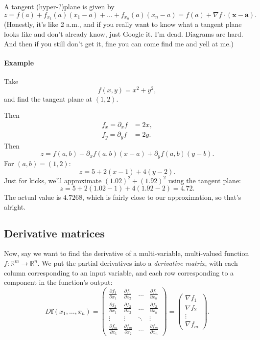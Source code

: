 \documentclass[11pt]{article}
\renewcommand{\vec}[1]{\mathbf{#1}}
\begin{document}
A tangent (hyper-?)plane is given by
\[
    z = f(a) + f_{x_1} (a) (x_1 - a) + \dots + f_{x_n} (a) (x_n - a) = f(a) + \nabla f \cdot (\vec x - \vec a).
\]
(Honestly, it's like 2 a.m., and if you really want to know what a tangent plane looks like and don't already know, just Google it. I'm dead. Diagrams are hard. And then if you still don't get it, fine you can come find me and yell at me.)

\paragraph{Example}

Take
\[
    f(x, y) = x^2 + y^2,
\]
and find the tangent plane at \((1, 2)\).

Then
\begin{align*}
    f_x = \partial_x f &= 2x, \\
    f_y = \partial_y f &= 2y.
\end{align*}
Then
\[
    z = f(a, b) + \partial_x f(a, b) (x-a) + \partial_y f(a, b) (y-b).
\]
For \((a, b) = (1, 2)\):
\[
    z = 5 + 2(x-1) + 4(y-2).
\]
Just for kicks, we'll approximate \((1.02)^2 + (1.92)^2\) using the tangent plane:
\[
    z = 5 + 2(1.02 - 1) + 4(1.92 - 2) = 4.72.
\]
The actual value is \(4.7268\), which is fairly close to our approximation, so that's alright.

\subsection*{Derivative matrices}

Now, say we want to find the derivative of a multi-variable, multi-valued function \(f\colon \mathbb R^m \to \mathbb R^n\). We put the partial derivatives into a \emph{derivative matrix}, with each column corresponding to an input variable, and each row corresponding to a component in the function's output:
\[
    D \vec f(x_1, \dots, x_n) = \begin{pmatrix}
        \frac{\partial f_1}{\partial x_1} & \frac{\partial f_1}{\partial x_2} & \dots & \frac{\partial f_1}{\partial x_n} \\
        \frac{\partial f_2}{\partial x_1} & \frac{\partial f_2}{\partial x_2} & \dots & \frac{\partial f_2}{\partial x_n} \\
        \vdots & \vdots & \ddots & \vdots \\
        \frac{\partial f_m}{\partial x_1} & \frac{\partial f_m}{\partial x_2} & \dots & \frac{\partial f_m}{\partial x_n}
    \end{pmatrix} = \begin{pmatrix}
        \nabla f_1 \\ \nabla f_2 \\ \vdots \\ \nabla f_m
    \end{pmatrix}.
\]
\end{document}
